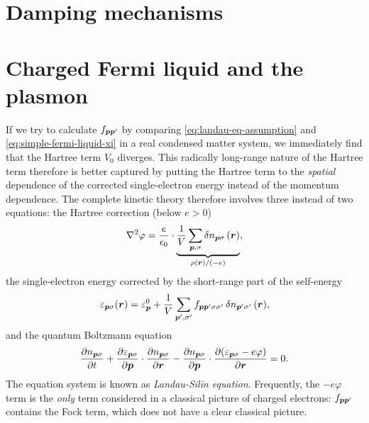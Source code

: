\documentclass[hyperref, a4paper]{article}
\begin{document}
\section{Damping mechanisms}



\section{Charged Fermi liquid and the plasmon}\label{sec:charged-fermi-liquid}

If we try to calculate $f_{\vb*{p} \vb*{p}'}$ by 
comparing \eqref{eq:landau-eq-assumption} and \eqref{eq:simple-fermi-liquid-xi}
in a real condensed matter system,
we immediately find that the Hartree term $V_0$ diverges.
This radically long-range nature of the Hartree term therefore 
is better captured by 
putting the Hartree term to the 
\emph{spatial} dependence of the corrected single-electron energy 
instead of the momentum dependence.
The complete kinetic theory therefore involves three instead of two equations:
the Hartree correction (below $e > 0$)
\begin{equation}
    \laplacian \varphi = \frac{e}{\epsilon_0} 
    \cdot \underbrace{
        \frac{1}{V} \sum_{\vb*{p}, \sigma} \var{n}_{\vb*{p} \sigma}(\vb*{r})
    }_{\rho(\vb*{r}) / (-e)},
\end{equation}
the single-electron energy corrected by 
the short-range part of the self-energy
\begin{equation}
    \varepsilon_{\vb*{p} \sigma}(\vb*{r}) = \varepsilon^0_{\vb*{p}} 
        + \frac{1}{V} \sum_{\vb*{p}', \sigma'} 
        f_{\vb*{p} \vb*{p}' \sigma \sigma'} \var{n}_{\vb*{p}' \sigma'}(\vb*{r}),
\end{equation}
and the quantum Boltzmann equation 
\begin{equation}
    \pdv{{n}_{\vb*{p} \sigma}}{t}  
    + \pdv{\varepsilon_{\vb*{p} \sigma}}{\vb*{p}} \cdot \pdv{{n}_{\vb*{p} \sigma}}{\vb*{r}}
    - \pdv{{n}_{\vb*{p} \sigma}}{\vb*{p}} \cdot \pdv{(\varepsilon_{\vb*{p} \sigma} - e \varphi)}{\vb*{r}} = 0.
\end{equation}
The equation system is known as \emph{Landau-Silin equation}.
Frequently, the $-e \varphi$ term is the \emph{only} term 
considered in a classical picture of charged electrons:
$f_{\vb*{p} \vb*{p}'}$ contains the Fock term,
which does not have a clear classical picture.
\end{document}
